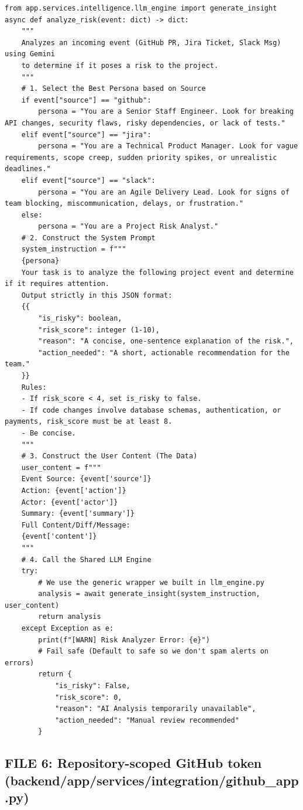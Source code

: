 \documentclass[11pt,a4paper]{article}
\begin{document}
{\begin{lstlisting}[style=python]
from app.services.intelligence.llm_engine import generate_insight
async def analyze_risk(event: dict) -> dict:
    """
    Analyzes an incoming event (GitHub PR, Jira Ticket, Slack Msg) using Gemini
    to determine if it poses a risk to the project.
    """
    # 1. Select the Best Persona based on Source
    if event["source"] == "github":
        persona = "You are a Senior Staff Engineer. Look for breaking API changes, security flaws, risky dependencies, or lack of tests."
    elif event["source"] == "jira":
        persona = "You are a Technical Product Manager. Look for vague requirements, scope creep, sudden priority spikes, or unrealistic deadlines."
    elif event["source"] == "slack":
        persona = "You are an Agile Delivery Lead. Look for signs of team blocking, miscommunication, delays, or frustration."
    else:
        persona = "You are a Project Risk Analyst."
    # 2. Construct the System Prompt
    system_instruction = f"""
    {persona}
    Your task is to analyze the following project event and determine if it requires attention.
    Output strictly in this JSON format:
    {{
        "is_risky": boolean,
        "risk_score": integer (1-10),
        "reason": "A concise, one-sentence explanation of the risk.",
        "action_needed": "A short, actionable recommendation for the team."
    }}
    Rules:
    - If risk_score < 4, set is_risky to false.
    - If code changes involve database schemas, authentication, or payments, risk_score must be at least 8.
    - Be concise.
    """
    # 3. Construct the User Content (The Data)
    user_content = f"""
    Event Source: {event['source']}
    Action: {event['action']}
    Actor: {event['actor']}
    Summary: {event['summary']}
    Full Content/Diff/Message:
    {event['content']}
    """
    # 4. Call the Shared LLM Engine
    try:
        # We use the generic wrapper we built in llm_engine.py
        analysis = await generate_insight(system_instruction, user_content)
        return analysis
    except Exception as e:
        print(f"[WARN] Risk Analyzer Error: {e}")
        # Fail safe (Default to safe so we don't spam alerts on errors)
        return {
            "is_risky": False,
            "risk_score": 0,
            "reason": "AI Analysis temporarily unavailable",
            "action_needed": "Manual review recommended"
        }
\end{lstlisting}

\subsection{FILE 6: Repository-scoped GitHub token\\(backend/app/services/integration/github\_app.py)}

}
\end{document}
